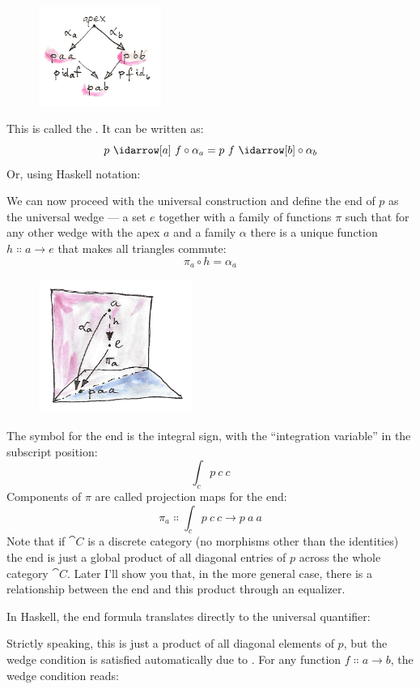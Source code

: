 \begin{figure}[H]
\centering
\includegraphics[width=40mm]{images/end-2.jpg}
\end{figure}

\noindent
This is called the . It can be written as:
\[p\ \idarrow[a]\ f \circ \alpha_a = p\ f\ \idarrow[b] \circ \alpha_b\]
Or, using Haskell notation:

We can now proceed with the universal construction and define the end of
$p$ as the universal wedge --- a set $e$ together with a
family of functions $\pi$ such that for any other wedge with the
apex $a$ and a family $\alpha$ there is a unique function
$h \Colon a \to e$ that makes all triangles commute:
\[\pi_a \circ h = \alpha_a\]

\begin{figure}[H]
\centering
\includegraphics[width=50mm]{images/end-21.jpg}
\end{figure}

\noindent
The symbol for the end is the integral sign, with the ``integration
variable'' in the subscript position:
\[\int_c p\ c\ c\]
Components of $\pi$ are called projection maps for the end:
\[\pi_a \Colon \int_c p\ c\ c \to p\ a\ a\]
Note that if $\cat{C}$ is a discrete category (no morphisms other than
the identities) the end is just a global product of all diagonal entries
of $p$ across the whole category $\cat{C}$. Later I'll show you
that, in the more general case, there is a relationship between the end
and this product through an equalizer.

In Haskell, the end formula translates directly to the universal
quantifier:

Strictly speaking, this is just a product of all diagonal elements of
$p$, but the wedge condition is satisfied automatically due to
. For any function
$f \Colon a \to b$, the wedge condition reads:

